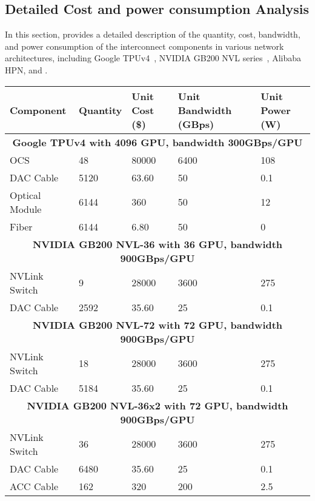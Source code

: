 \begin{appendices}






\vspace{-12em}
\section{Detailed Cost and power consumption Analysis}
\label{appendix:cost}
In this section,  provides a detailed description of the quantity, cost, bandwidth, and power consumption of the interconnect components in various network architectures, including Google TPUv4~\cite{isca2023tpu}, NVIDIA GB200 NVL series~\cite{nvl72}, Alibaba HPN\cite{sigcomm2024hpn}, and \sys{}.


\begin{table*}[h!t] \small
    \centering
    \begin{tabular}{lllll}
    \toprule
    
    \textbf{Component} & \textbf{Quantity} & \textbf{Unit Cost (\$)}  & \textbf{Unit Bandwidth (GBps)} & \textbf{Unit Power (W)} \\

    \midrule
    \multicolumn{5}{c}{\textbf{Google TPUv4\cite{isca2023tpu} with 4096 GPU, bandwidth 300GBps/GPU}} \\
    
    \midrule
    OCS\cite{sigcomm2023lightwave} & 48 & 80000 & 6400 & 108 \\
    DAC Cable\cite{400G_DAC} & 5120 & 63.60 & 50 & 0.1 \\
    Optical Module\cite{400G_OPTICAL_MODULE} & 6144 & 360 & 50 & 12  \\
    Fiber\cite{FIBER}& 6144 & 6.80 & 50 & 0 \\
    
    \midrule
    \multicolumn{5}{c}{\textbf{NVIDIA GB200 NVL-36\cite{SEMIANALYSIS_GB200} with 36 GPU, bandwidth 900GBps/GPU}}\\
    \midrule
    NVLink Switch\cite{SEMIANALYSIS_Power} & 9 & 28000 & 3600 & 275 \\
    DAC Cable\cite{200G_DAC} & 2592 & 35.60 & 25 & 0.1 \\
    
    \midrule
    \multicolumn{5}{c}{\textbf{NVIDIA GB200 NVL-72\cite{nvl72}\cite{SEMIANALYSIS_GB200} with 72 GPU, bandwidth 900GBps/GPU}}\\
    \midrule
    NVLink Switch\cite{SEMIANALYSIS_Power} & 18 & 28000 & 3600 & 275 \\
    DAC Cable\cite{200G_DAC} & 5184 & 35.60 & 25 & 0.1 \\
    \midrule
    \multicolumn{5}{c}{\textbf{NVIDIA GB200 NVL-36x2\cite{SEMIANALYSIS_GB200} with 72 GPU, bandwidth 900GBps/GPU}}\\
    \midrule
    NVLink Switch\cite{SEMIANALYSIS_Power} & 36 & 28000 & 3600 &  275\\
    DAC Cable\cite{200G_DAC} & 6480 & 35.60 & 25 & 0.1 \\
    ACC Cable\cite{SEMIANALYSIS_Power} & 162 & 320 & 200 & 2.5 \\


\end{tabular}
\end{table*}
\end{appendices}
